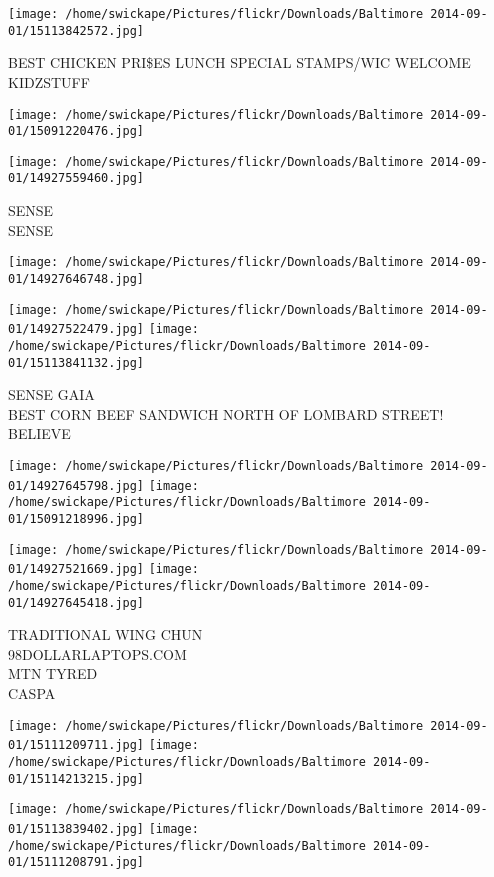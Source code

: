 \documentclass[10pt,letterpaper]{article}
\begin{document}
\vspace{0.25in}
\texttt{[image: /home/swickape/Pictures/flickr/Downloads/Baltimore 2014-09-01/15113842572.jpg]}

BEST CHICKEN PRI\$ES LUNCH SPECIAL STAMPS/WIC WELCOME\\
KIDZSTUFF
\pagebreak

\texttt{[image: /home/swickape/Pictures/flickr/Downloads/Baltimore 2014-09-01/15091220476.jpg]}

\vspace{0.25in}
\texttt{[image: /home/swickape/Pictures/flickr/Downloads/Baltimore 2014-09-01/14927559460.jpg]}

SENSE\\
SENSE
\pagebreak

\texttt{[image: /home/swickape/Pictures/flickr/Downloads/Baltimore 2014-09-01/14927646748.jpg]}

\vspace{0.25in}
\texttt{[image: /home/swickape/Pictures/flickr/Downloads/Baltimore 2014-09-01/14927522479.jpg]}
\texttt{[image: /home/swickape/Pictures/flickr/Downloads/Baltimore 2014-09-01/15113841132.jpg]}

SENSE GAIA\\
BEST CORN BEEF SANDWICH NORTH OF LOMBARD STREET!\\
BELIEVE
\pagebreak

\texttt{[image: /home/swickape/Pictures/flickr/Downloads/Baltimore 2014-09-01/14927645798.jpg]}
\texttt{[image: /home/swickape/Pictures/flickr/Downloads/Baltimore 2014-09-01/15091218996.jpg]}

\texttt{[image: /home/swickape/Pictures/flickr/Downloads/Baltimore 2014-09-01/14927521669.jpg]}
\texttt{[image: /home/swickape/Pictures/flickr/Downloads/Baltimore 2014-09-01/14927645418.jpg]}

TRADITIONAL WING CHUN\\
98DOLLARLAPTOPS.COM\\
MTN TYRED\\
CASPA
\pagebreak

\texttt{[image: /home/swickape/Pictures/flickr/Downloads/Baltimore 2014-09-01/15111209711.jpg]}
\texttt{[image: /home/swickape/Pictures/flickr/Downloads/Baltimore 2014-09-01/15114213215.jpg]}

\texttt{[image: /home/swickape/Pictures/flickr/Downloads/Baltimore 2014-09-01/15113839402.jpg]}
\texttt{[image: /home/swickape/Pictures/flickr/Downloads/Baltimore 2014-09-01/15111208791.jpg]}
\end{document}
